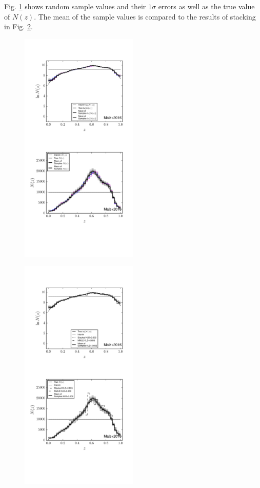 \documentclass[preprint]{aastex}
\begin{document}
Fig. \ref{fig:noisy-samp} shows random sample values and their $1\sigma$ errors 
as well as the true value of $N(z)$.  The mean of the sample values is compared 
to the results of stacking in Fig. \ref{fig:noisy-comp}.

\begin{figure}
\includegraphics[width=0.5\textwidth]{figs/vars/samps.pdf}
\caption{}
\label{fig:noisy-samp}
\end{figure}

\begin{figure}
\includegraphics[width=0.5\textwidth]{figs/vars/comps.pdf}
\caption{}
\label{fig:noisy-comp}
\end{figure}
\end{document}
